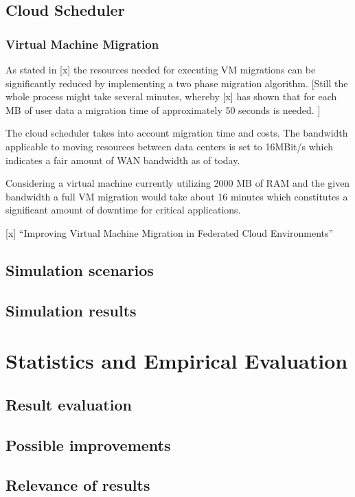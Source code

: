 \subsection{Cloud Scheduler}

\subsubsection{Virtual Machine Migration}

As stated in [x] the resources needed for executing VM migrations can be significantly reduced by implementing a two phase migration algorithm. 
[Still the whole process might take several minutes, whereby [x] has shown that for each MB of user data a migration time of approximately 50 seconds is needed. ]

The cloud scheduler takes into account migration time and costs. The bandwidth applicable to moving resources between data centers is set to 16MBit/s which indicates a fair amount of WAN bandwidth as of today. 

Considering a virtual machine currently utilizing 2000 MB of RAM and the given bandwidth a full VM migration would take about 16 minutes which constitutes a significant amount of downtime for critical applications. 


[x] "`Improving Virtual Machine Migration in Federated Cloud Environments"' 

\subsection{Simulation scenarios}

\subsection{Simulation results}


\section{Statistics and Empirical Evaluation}

\subsection{Result evaluation}

\subsection{Possible improvements}

\subsection{Relevance of results}



